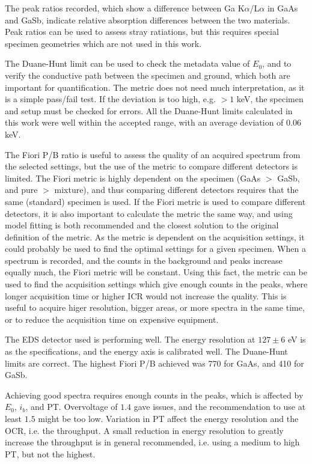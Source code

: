 The peak ratios recorded, which show a difference between Ga K$\alpha$/L$\alpha$ in GaAs and GaSb, indicate relative absorption differences between the two materials.
Peak ratios can be used to assess stray ratiations, but this requires special specimen geometries which are not used in this work.

The Duane-Hunt limit can be used to check the metadata value of $E_0$, and to verify the conductive path between the specimen and ground, which both are important for quantification.
The metric does not need much interpretation, as it is a simple pass/fail test.
If the deviation is too high, e.g. $>1$ keV, the specimen and setup must be checked for errors.
All the Duane-Hunt limits calculated in this work were well within the accepted range, with an average deviation of $0.06$ keV.

The Fiori P/B ratio is useful to assess the quality of an acquired spectrum from the selected settings, but the use of the metric to compare different detectors is limited.
The Fiori metric is highly dependent on the specimen (GaAs $>$ GaSb, and pure $>$ mixture), and thus comparing different detectors requires that the same (standard) specimen is used.
If the Fiori metric is used to compare different detectors, it is also important to calculate the metric the same way, and using model fitting is both recommended and the closest solution to the original definition of the metric.
As the metric is dependent on the acquisition settings, it could probably be used to find the optimal settings for a given specimen.
When a spectrum is recorded, and the counts in the background and peaks increase equally much, the Fiori metric will be constant.
Using this fact, the metric can be used to find the acquisition settings which give enough counts in the peaks, where longer acquisition time or higher ICR would not increase the quality.
This is useful to acquire higer resolution, bigger areas, or more spectra in the same time, or to reduce the acquisition time on expensive equipment.


The EDS detector used is performing well.
The energy resolution at $127 \pm6$ eV is as the specifications, and the energy axis is calibrated well.
The Duane-Hunt limits are correct.
The highest Fiori P/B achieved was 770 for GaAs, and 410 for GaSb.

Achieving good spectra requires enough counts in the peaks, which is affected by $E_0$, $i_b$, and PT.
Overvoltage of $1.4$ gave issues, and the recommendation to use at least $1.5$ might be too low.
Variation in PT affect the energy resolution and the OCR, i.e. the throughput.
A small reduction in energy resolution to greatly increase the throughput is in general recommended, i.e. using a medium to high PT, but not the highest.





